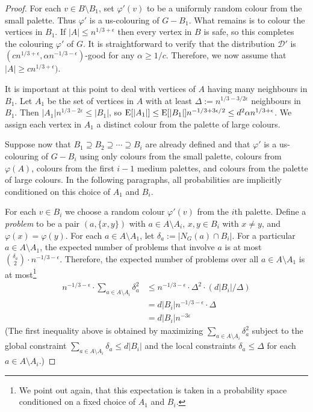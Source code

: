 \documentclass[kpfonts]{patmorin}
\newcommand{\defin}[1]{\emph{\color{brightmaroon}#1}}
\begin{document}
\begin{proof}
  For each $v\in B\setminus B_1$, set $\varphi'(v)$ to be a uniformly random colour from the small palette.  Thus $\varphi'$ is a us-colouring of $G-B_1$.  What remains is to colour the vertices in $B_1$.  If $|A|\le n^{1/3+\epsilon}$ then every vertex in $B$ is safe, so this completes the colouring $\varphi'$ of $G$.  It is straightforward to verify that the distribution $\mathcal{D}'$ is $(cn^{1/3+\epsilon},\alpha n^{-1/3-\epsilon})$-good for any $\alpha \ge 1/c$.  Therefore, we now assume that $|A|\ge cn^{1/3+\epsilon})$.

  It is important at this point to deal with vertices of $A$ having many neighbours in $B_1$.  Let $A_1$ be the set of vertices in $A$ with at least $\Delta:=n^{1/3-3/2\epsilon}$ neighbours in $B_1$.  Then $|A_1|n^{1/3-2\epsilon}\le |B_1|$, so $\mathrm{E}[|A_1|]\le \mathrm{E}[|B_1|]n^{-1/3+3\epsilon/2}\le d^2\alpha n^{1/3+\epsilon}$.  We assign each vertex in $A_1$ a distinct colour from the palette of large colours.

  Suppose now that $B_1\supseteq B_2\supseteq \cdots\supseteq B_{i}$ are already defined and that $\varphi'$ is a us-colouring of $G-B_i$ using only colours from the small palette, colours from $\varphi(A)$, colours from the first $i-1$ medium palettes, and colours from the palette of large colours. In the following paragraphs, all probabilities are implicitly conditioned on this choice of $A_1$ and $B_i$.

  For each $v\in B_i$ we choose a random colour $\varphi'(v)$ from the $i$th palette.  Define a \defin{problem} to be a pair $(a,\{x,y\})$ with $a\in A\setminus A_i$, $x,y\in B_i$ with $x\neq y$, and $\varphi(x)=\varphi(y)$. For each $a\in A\setminus A_1$, let $\delta_a:= |N_G(a)\cap B_i|$.  For a particular $a\in A\setminus A_1$, the expected number of problems that involve $a$ is at most $\binom{\delta_a}{2}\cdot n^{-1/3-\epsilon}$. Therefore, the expected number of problems over all $a\in A\setminus A_1$ is at most\footnote{We point out again, that this expectation is taken in a probability space conditioned on a fixed choice of $A_1$ and $B_i$.}
  \begin{align*}
    n^{-1/3-\epsilon}\cdot\sum_{a\in A\setminus A_i} \delta_a^2 &
    \le n^{-1/3-\epsilon}\cdot \Delta^2 \cdot (d|B_i|/\Delta) \\
    & = d|B_i| n^{-1/3-\epsilon}\cdot \Delta \\
    & = d|B_i| n^{-3\epsilon}
  \end{align*}
  (The first inequality above is obtained by maximizing $\sum_{a\in A\setminus A_i} \delta_a^2$ subject to the global constraint $\sum_{a\in A\setminus A_i} \delta_a\le d|B_i|$ and the local constraints $\delta_a\le \Delta$ for each $a\in A\setminus A_i$.)


\end{proof}
\end{document}
